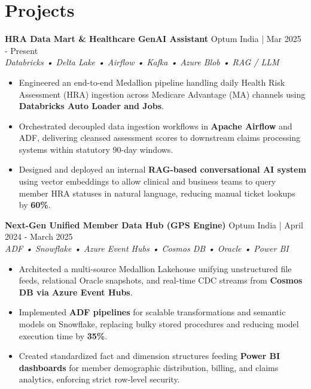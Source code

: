 \documentclass[a4paper,8pt]{article}
\begin{document}
\section{Projects}
\vspace{0.2cm}

\noindent
\textbf{HRA Data Mart \& Healthcare GenAI Assistant} 
\hfill 
\textcolor[HTML]{371e77}{Optum India | Mar 2025 - Present} \\
\textit{\textcolor[HTML]{371e77}{Databricks • Delta Lake • Airflow • Kafka • Azure Blob • RAG / LLM}}\\[-1.7em]

\begin{itemize}[leftmargin=1.2em, itemsep=1pt, topsep=0pt, parsep=0pt, partopsep=0pt]
    \item Engineered an end-to-end Medallion pipeline handling daily Health Risk Assessment (HRA) ingestion across Medicare Advantage (MA) channels using \textbf{Databricks Auto Loader and Jobs}.
    \item Orchestrated decoupled data ingestion workflows in \textbf{Apache Airflow} and ADF, delivering cleansed assessment scores to downstream claims processing systems within statutory 90-day windows.
    \item Designed and deployed an internal \textbf{RAG-based conversational AI system} using vector embeddings to allow clinical and business teams to query member HRA statuses in natural language, reducing manual ticket lookups by \textbf{60\%}.
\end{itemize}
\newpage
\noindent
\textbf{Next-Gen Unified Member Data Hub (GPS Engine)} 
\hfill 
\textcolor[HTML]{371e77}{Optum India | April 2024 - March 2025} \\
\textit{\textcolor[HTML]{371e77}{ ADF • Snowflake • Azure Event Hubs • Cosmos DB • Oracle • Power BI}}\\[-1.7em]

\begin{itemize}[leftmargin=1.2em, itemsep=1pt, topsep=0pt, parsep=0pt, partopsep=0pt]
    \item Architected a multi-source Medallion Lakehouse unifying unstructured file feeds, relational Oracle snapshots, and real-time CDC streams from \textbf{Cosmos DB via Azure Event Hubs}.
    \item Implemented \textbf{ADF pipelines} for scalable transformations and semantic models on Snowflake, replacing bulky stored procedures and reducing model execution time by \textbf{35\%}.
    \item Created standardized fact and dimension structures feeding \textbf{Power BI dashboards} for member demographic distribution, billing, and claims analytics, enforcing strict row-level security.
\end{itemize}
\vspace{-0.2em}
\end{document}
